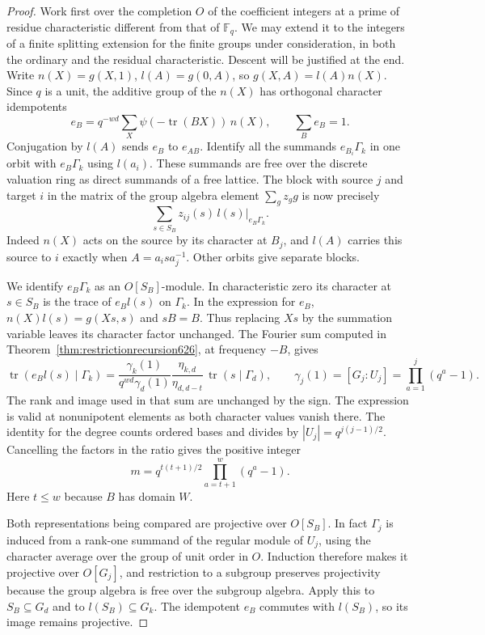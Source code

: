 \documentclass[a4paper,11pt]{article}
\theoremstyle{definition}
\theoremstyle{remark}
\numberwithin{equation}{section}
\begin{document}
\begin{proof}
Work first over the completion \(O\) of the coefficient integers
at a prime of residue characteristic different from that of
\(\mathbb F_q\). We may extend it to the integers of a finite
splitting extension for the finite groups under consideration,
in both the ordinary and the residual characteristic. Descent
will be justified at the end. Write \(n(X)=g(X,1)\),
\(l(A)=g(0,A)\), so \(g(X,A)=l(A)n(X)\).
Since \(q\) is a unit, the additive group of the \(n(X)\) has
orthogonal character idempotents
\[
 e_B=q^{-wd}\sum_X \psi(-\operatorname{tr}(BX))\,n(X),
                      \qquad \sum_B e_B=1 .
\]
Conjugation by \(l(A)\) sends \(e_B\) to \(e_{AB}\). Identify all
the summands \(e_{B_i}\Gamma_k\) in one orbit with \(e_B\Gamma_k\)
using \(l(a_i)\). These summands are free over the discrete valuation
ring as direct summands of a free lattice. The block with source
\(j\) and target \(i\) in the matrix of the group algebra element
\(\sum_g z_g g\) is now precisely
\[
                  \sum_{s\in S_B} z_{ij}(s)\,l(s)|_{e_B\Gamma_k}.
\]
Indeed \(n(X)\) acts on the source by its character at \(B_j\),
and \(l(A)\) carries this source to \(i\) exactly when
\(A=a_i s a_j^{-1}\). Other orbits give separate blocks.

We identify \(e_B\Gamma_k\) as an \(O[S_B]\)-module.
In characteristic zero its character at \(s\in S_B\) is the trace
of \(e_Bl(s)\) on \(\Gamma_k\). In the expression for \(e_B\),
\(n(X)l(s)=g(Xs,s)\) and \(sB=B\). Thus replacing \(Xs\) by
the summation variable leaves its character factor unchanged.
The Fourier sum computed in Theorem~\ref{thm:restrictionrecursion626},
at frequency \(-B\), gives
\[
 \operatorname{tr}(e_Bl(s)\mid\Gamma_k)
  =\frac{\gamma_k(1)}{q^{wd}\gamma_d(1)}
           \frac{\eta_{k,d}}{\eta_{d,d-t}}\,
                    \operatorname{tr}(s\mid\Gamma_d),
 \qquad
 \gamma_j(1)=[G_j:U_j]=\prod_{a=1}^j(q^a-1).
\]
The rank and image used in that sum are unchanged by the sign.
The expression is valid at nonunipotent elements as both
character values vanish there. The identity for the degree counts
ordered bases and divides by \(|U_j|=q^{j(j-1)/2}\).
Cancelling the factors in the ratio gives the positive integer
\[
              m=q^{t(t+1)/2}\prod_{a=t+1}^{w}(q^a-1).
\]
Here \(t\le w\) because \(B\) has domain \(W\).

Both representations being compared are projective over
\(O[S_B]\). In fact \(\Gamma_j\) is induced from a rank-one
summand of the regular module of \(U_j\), using the character
average over the group of unit order in \(O\). Induction
therefore makes it projective over \(O[G_j]\), and restriction
to a subgroup preserves projectivity because the group algebra
is free over the subgroup algebra. Apply this to \(S_B\subseteq G_d\)
and to \(l(S_B)\subseteq G_k\). The idempotent \(e_B\) commutes
with \(l(S_B)\), so its image remains projective.


\end{proof}
\end{document}
